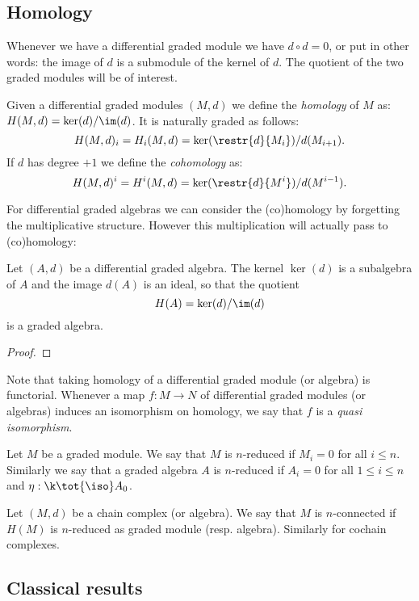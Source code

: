 \subsection{Homology}

Whenever we have a differential graded module we have $d \circ d = 0$, or put in other words: the image of $d$ is a submodule of the kernel of $d$. The quotient of the two graded modules will be of interest.

\begin{definition}
	Given a differential graded modules $(M, d)$ we define the \emph{homology} of $M$ as: $H(M, d) = \ker(d) / \im(d)$.
	It is naturally graded as follows:
	$$ H(M, d)_i = H_i(M, d) = \ker(\restr{d}{M_i}) / d(M_{i+1}). $$
	If $d$ has degree $+1$ we define the \emph{cohomology} as:
	$$ H(M, d)^i = H^i(M, d) = \ker(\restr{d}{M^i}) / d(M^{i-1}). $$
\end{definition}

For differential graded algebras we can consider the (co)homology by forgetting the multiplicative structure. However this multiplication will actually pass to (co)homology:

\begin{lemma}
	Let $(A, d)$ be a differential graded algebra. The kernel $\ker(d)$ is a subalgebra of $A$ and the image $d(A)$ is an ideal, so that the quotient
	$$ H(A) = \ker(d) / \im(d) $$
	is a graded algebra.
\end{lemma}
\begin{proof}
\end{proof}

Note that taking homology of a differential graded module (or algebra) is functorial. Whenever a map $f: M \to N$ of differential graded modules (or algebras) induces an isomorphism on homology, we say that $f$ is a \emph{quasi isomorphism}.

\begin{definition}
	Let $M$ be a graded module. We say that $M$ is $n$-reduced if $M_i = 0$ for all $i \leq n$. Similarly we say that a graded algebra $A$ is $n$-reduced if $A_i = 0$ for all $1 \leq i \leq n$ and $\eta: \k \tot{\iso} A_0$.

	Let $(M, d)$ be a chain complex (or algebra). We say that $M$ is $n$-connected if $H(M)$ is $n$-reduced as graded module (resp. algebra). Similarly for cochain complexes.
\end{definition}


\subsection{Classical results}

